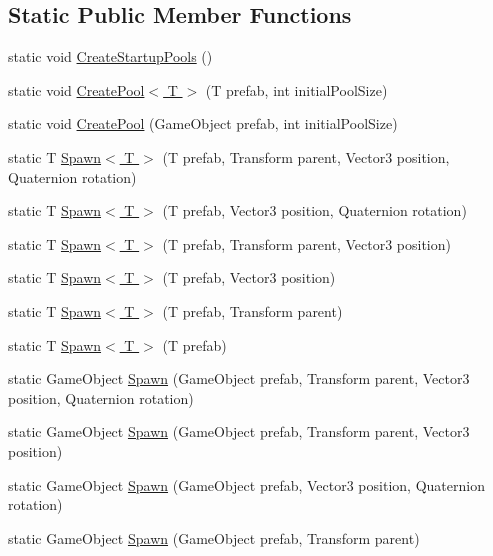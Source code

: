 \subsection*{Static Public Member Functions}
\begin{DoxyCompactItemize}
\item 
static void \hyperlink{class_object_pool_ab3c9b59addc7edeb4c3bba7cf8d91be5}{Create\+Startup\+Pools} ()
\item 
static void \hyperlink{class_object_pool_abc0f2dc027be0d2a48bfed52d54ecefc}{Create\+Pool$<$ T $>$} (T prefab, int initial\+Pool\+Size)
\item 
static void \hyperlink{class_object_pool_ac33e07988fcd1488ab83374adf626573}{Create\+Pool} (Game\+Object prefab, int initial\+Pool\+Size)
\item 
static T \hyperlink{class_object_pool_ae79ca96adaf09d8a18b5b4d85dcf70c4}{Spawn$<$ T $>$} (T prefab, Transform parent, Vector3 position, Quaternion rotation)
\item 
static T \hyperlink{class_object_pool_ad86e0eff234f8e870c4edb5a0035f1ff}{Spawn$<$ T $>$} (T prefab, Vector3 position, Quaternion rotation)
\item 
static T \hyperlink{class_object_pool_a0ccbd02f24296bd2eb4f95c28dee9330}{Spawn$<$ T $>$} (T prefab, Transform parent, Vector3 position)
\item 
static T \hyperlink{class_object_pool_af26959630251e99e310f2e26cb2113e0}{Spawn$<$ T $>$} (T prefab, Vector3 position)
\item 
static T \hyperlink{class_object_pool_a53f3570f02c4dbe538a608230d2b924c}{Spawn$<$ T $>$} (T prefab, Transform parent)
\item 
static T \hyperlink{class_object_pool_aec4352184e8d24cb65c0af013d6966a0}{Spawn$<$ T $>$} (T prefab)
\item 
static Game\+Object \hyperlink{class_object_pool_aac781682280984a6e16726959fbd10ce}{Spawn} (Game\+Object prefab, Transform parent, Vector3 position, Quaternion rotation)
\item 
static Game\+Object \hyperlink{class_object_pool_ae14db9da6310d7d413fb649f7a14b7c0}{Spawn} (Game\+Object prefab, Transform parent, Vector3 position)
\item 
static Game\+Object \hyperlink{class_object_pool_a92b3d6fa0e836ca91c955eeadb91b76e}{Spawn} (Game\+Object prefab, Vector3 position, Quaternion rotation)
\item 
static Game\+Object \hyperlink{class_object_pool_a92a988e93c0c1ef2e91501dcb830daf4}{Spawn} (Game\+Object prefab, Transform parent)

\end{DoxyCompactItemize}
